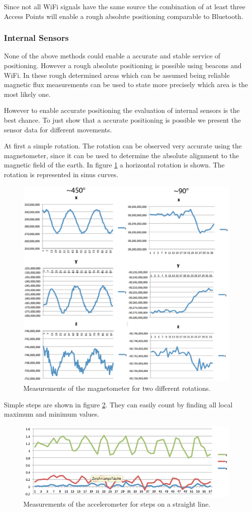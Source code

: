 Since not all WiFi signals have the same source the combination of at least three Access Points will enable a rough absolute positioning comparable to Bluetooth. 

\subsubsection{Internal Sensors}
None of the above methods could enable a accurate and stable service of positioning. However a rough absolute positioning is possible using beacons and WiFi. In these rough determined areas which can be assumed being reliable magnetic flux measurements can be used to state more precisely which area is the most likely one.

However to enable accurate positioning the evaluation of internal sensors is the best chance. To just show that a accurate positioning is possible we present the sensor data for different movements. 

At first a simple rotation. The rotation can be observed very accurate using the magnetometer, since it can be used to determine the absolute alignment to the magnetic field of the earth. In figure  \ref{fig:rotation} a horizontal rotation is shown. The rotation is represented in sinus curves. 

\begin{figure}[h]
	\centering
		\includegraphics[width=.6\textwidth]{images/experiments/rotation.png}
	\caption{Measurements of the magnetometer for two different rotations.}
	\label{fig:rotation}
\end{figure}

Simple steps are shown in figure \ref{fig:steps}. They can easily count by finding all local maximum and minimum values. 


\begin{figure}[h]
	\centering
		\includegraphics[width=.6\textwidth]{images/experiments/steps.png}
	\caption{Measurements of the accelerometer for steps on a straight line.}
	\label{fig:steps}
\end{figure}

